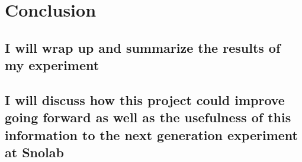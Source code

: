 \section{Conclusion}
\subsection{I will wrap up and summarize the results of my experiment}

\subsection{I will discuss how this project could improve going forward as well as the usefulness of this information to the next generation experiment at Snolab}
